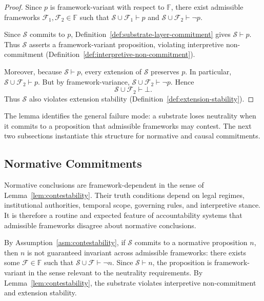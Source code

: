 \begin{proof}
  Since $p$ is framework-variant with respect to $\mathbb{F}$,
  there exist admissible frameworks
  $\mathcal{F}_1,\mathcal{F}_2 \in \mathbb{F}$
  such that
  $\mathcal{S}\cup\mathcal{F}_1 \vdash p$
  and
  $\mathcal{S}\cup\mathcal{F}_2 \vdash \neg p$.

  Since $\mathcal{S}$ commits to $p$,
  Definition~\ref{def:substrate-layer-commitment}
  gives $\mathcal{S}\vdash p$.
  Thus $\mathcal{S}$ asserts a framework-variant proposition,
  violating interpretive non-commitment
  (Definition~\ref{def:interpretive-non-commitment}).

  Moreover, because $\mathcal{S}\vdash p$,
  every extension of $\mathcal{S}$ preserves $p$.
  In particular,
  $\mathcal{S}\cup\mathcal{F}_2 \vdash p$.
  But by framework-variance,
  $\mathcal{S}\cup\mathcal{F}_2 \vdash \neg p$.
  Hence
  \[
    \mathcal{S}\cup\mathcal{F}_2 \vdash \bot .
  \]
  Thus $\mathcal{S}$ also violates extension stability
  (Definition~\ref{def:extension-stability}).
\end{proof}

The lemma identifies the general failure mode:
a substrate loses neutrality when it commits to
a proposition that admissible frameworks may contest.
The next two subsections instantiate this structure
for normative and causal commitments.

\subsection{Normative Commitments}
\label{subsec:normative}

Normative conclusions are framework-dependent
in the sense of Lemma~\ref{lem:contestability}.
Their truth conditions depend on legal regimes,
institutional authorities, temporal scope, governing rules, and interpretive stance.
It is therefore a routine and expected feature of accountability systems
that admissible frameworks disagree about normative conclusions.

By Assumption~\ref{asm:contestability},
if $\mathcal{S}$ commits to a normative proposition $n$,
then $n$ is not guaranteed invariant across admissible frameworks:
there exists some $\mathcal{F} \in \mathbb{F}$ such that
$\mathcal{S} \cup \mathcal{F} \vdash \neg n$.
Since $\mathcal{S} \vdash n$,
the proposition is framework-variant in the sense relevant
to the neutrality requirements.
By Lemma~\ref{lem:contestability},
the substrate violates interpretive non-commitment
and extension stability.

